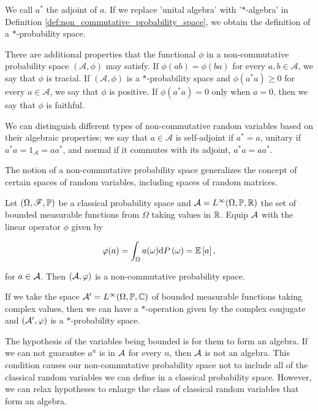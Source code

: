     We call \(a^*\) the adjoint of \(a\). If we replace 'unital algebra' with '\(*\)-algebra' in Definition \ref{def:non_commutative_probability_space}, we obtain the definition of a \(*\)-probability space.

    There are additional properties that the functional \(\phi\) in a non-commutative probability space \((\mathcal{A}, \phi)\) may satisfy. If \(\phi(ab) = \phi(ba)\) for every \(a, b \in \mathcal{A}\), we say that \(\phi\) is tracial. If \((\mathcal{A}, \phi)\) is a \(*\)-probability space and \(\phi(a^*a) \geq 0\) for every \(a \in \mathcal{A}\), we say that \(\phi\) is positive. If \(\phi(a^*a) = 0\) only when \(a = 0\), then we say that \(\phi\) is faithful.
    
    We can distinguish different types of non-commutative random variables based on their algebraic properties; we say that \(a \in \mathcal{A}\) is self-adjoint if \(a^* = a\), unitary if \(a^*a = 1_{\mathcal{A}} = aa^*\), and normal if it commutes with its adjoint, \(a^*a = aa^*\).
    
    The notion of a non-commutative probability space generalizes the concept of certain spaces of random variables, including spaces of random matrices.


    \begin{example}
        Let $(\Omega, \mathscr F, \mathbb P)$ be a classical probability space and $\mathcal A = L^\infty(\Omega, \mathbb P, \mathbb R)$ the set of bounded measurable functions from $\Omega$ taking values in $\mathbb R$. Equip $\mathcal A$ with the linear operator $\phi$ given by 

        \begin{equation*}
            \varphi(a) = \int_\Omega a(\omega) \mathrm d P\left( \omega \right) = \mathbb E \left[ a \right],
        \end{equation*}

        \noindent for $a \in \mathcal A$. Then $(\mathcal A,\varphi)$ is a non-commutative probability space. 

        If we take the space $\mathcal A' = L^\infty(\Omega, \mathbb P, \mathbb C)$ of bounded measurable functions taking complex values, then we can have a $*$-operation given by the complex conjugate and $(\mathcal A', \varphi)$ is a $*$-probability space.
    \end{example}

    The hypothesis of the variables being bounded is for them to form an algebra. If we can not guarantee $a^n$ is in $\mathcal A$ for every $n$, then $\mathcal A$ is not an algebra. This condition causes our non-commutative probability space not to include all of the classical random variables we can define in a classical probability space. However, we can relax hypotheses to enlarge the class of classical random variables that form an algebra.

